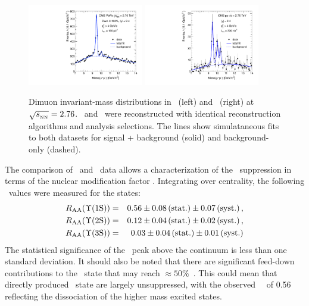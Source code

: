 \begin{figure}[t]
\begin{center}
    \includegraphics[width=0.45\textwidth]{qqbarfigures/hiFitPt4Erf}
    \includegraphics[width=0.45\textwidth]{qqbarfigures/ppFitPt4Erf}
    \caption{Dimuon invariant-mass distributions in \PbPb\ (left) and \pp\ (right)
at $\sqrt{s_{_{\rm NN}}} = 2.76$\TeV. \PbPb\ and \pp\ were reconstructed with identical 
reconstruction algorithms and analysis selections. The lines show simulataneous fits to both 
datasets for signal + background (solid) and background-only (dashed).}
\label{fig:GR:mass}
\end{center}
\end{figure}

The comparison of \pp\ and \PbPb\ data allows a characterization of the \PgU\ suppression
in terms of the nuclear modification factor \Raa.
Integrating over centrality, the following \Raa\ values were measured for the \PgUn states:
\begin{eqnarray}
R_\mathrm{AA} (\Upsilon\mathrm{(1S)}) &=& 0.56 \pm 0.08\,\mbox{(stat.)} \pm 0.07\,\mbox{(syst.)} \,, \\
R_\mathrm{AA} (\Upsilon\mathrm{(2S)}) &=& 0.12 \pm 0.04\,\mbox{(stat.)} \pm 0.02\,\mbox{(syst.)} \,, \nonumber \\
R_\mathrm{AA} (\Upsilon\mathrm{(3S)}) &=& 0.03 \pm 0.04\,\mbox{(stat.)} \pm 0.01\,\mbox{(syst.)}  \nonumber\\
\end{eqnarray}
The statistical significance of the \PgUc\ peak above the continuum is less than one standard deviation.
It should also be noted that there are significant feed-down contributions to
the \PgUa\ state that may reach $\approx 50\%$~\cite{Affolder:1999wm, Aaij:2012se}.
This could mean that directly produced \PgUa\ state are largely unsuppressed, with
the observed \PgUa\ \Raa\ of 0.56 reflecting the dissociation of the higher mass excited states.

